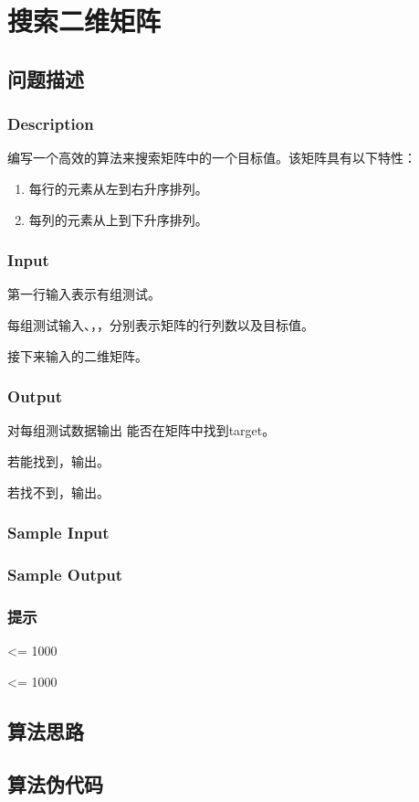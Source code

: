 \section{搜索二维矩阵}
\subsection{问题描述}
\subsubsection*{Description}
编写一个高效的算法来搜索矩阵中的一个目标值。该矩阵具有以下特性：
\begin{enumerate}
	\item 每行的元素从左到右升序排列。
	\item 每列的元素从上到下升序排列。
\end{enumerate}

\subsubsection*{Input}

第一行输入表示有组测试。

每组测试输入、，，分别表示矩阵的行列数以及目标值。

接下来输入的二维矩阵。

\subsubsection*{Output}

对每组测试数据输出 能否在矩阵中找到target。

若能找到，输出。

若找不到，输出。

\subsubsection*{Sample Input}








\subsubsection*{Sample Output}


\subsubsection*{提示}
 <= 1000

 <= 1000

\subsection{算法思路}

\subsection{算法伪代码}
